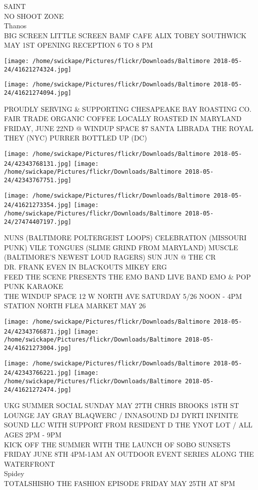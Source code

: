 \documentclass[10pt,letterpaper]{article}
\begin{document}
SAINT\\
NO SHOOT ZONE\\
Thanos\\
BIG SCREEN LITTLE SCREEN BAMF CAFE ALIX TOBEY SOUTHWICK MAY 1ST OPENING RECEPTION 6 TO 8 PM
\pagebreak

\texttt{[image: /home/swickape/Pictures/flickr/Downloads/Baltimore 2018-05-24/41621274324.jpg]}

\vspace{0.25in}
\texttt{[image: /home/swickape/Pictures/flickr/Downloads/Baltimore 2018-05-24/41621274094.jpg]}

PROUDLY SERVING \& SUPPORTING CHESAPEAKE BAY ROASTING CO. FAIR TRADE ORGANIC COFFEE LOCALLY ROASTED IN MARYLAND\\
FRIDAY, JUNE 22ND @ WINDUP SPACE \$7 SANTA LIBRADA THE ROYAL THEY (NYC) PURRER BOTTLED UP (DC)
\pagebreak

\texttt{[image: /home/swickape/Pictures/flickr/Downloads/Baltimore 2018-05-24/42343768131.jpg]}
\texttt{[image: /home/swickape/Pictures/flickr/Downloads/Baltimore 2018-05-24/42343767751.jpg]}

\texttt{[image: /home/swickape/Pictures/flickr/Downloads/Baltimore 2018-05-24/41621273354.jpg]}
\texttt{[image: /home/swickape/Pictures/flickr/Downloads/Baltimore 2018-05-24/27474407197.jpg]}

NUNS (BALTIMORE POLTERGEIST LOOPS) CELEBRATION (MISSOURI PUNK) VILE TONGUES (SLIME GRIND FROM MARYLAND) MUSCLE (BALTIMORE'S NEWEST LOUD RAGERS) SUN JUN @ THE CR\\
DR. FRANK EVEN IN BLACKOUTS MIKEY ERG\\
FEED THE SCENE PRESENTS THE EMO BAND LIVE BAND EMO \& POP PUNK KARAOKE\\
THE WINDUP SPACE 12 W NORTH AVE SATURDAY 5/26 NOON {-} 4PM STATION NORTH FLEA MARKET MAY 26
\pagebreak

\texttt{[image: /home/swickape/Pictures/flickr/Downloads/Baltimore 2018-05-24/42343766871.jpg]}
\texttt{[image: /home/swickape/Pictures/flickr/Downloads/Baltimore 2018-05-24/41621273004.jpg]}

\texttt{[image: /home/swickape/Pictures/flickr/Downloads/Baltimore 2018-05-24/42343766221.jpg]}
\texttt{[image: /home/swickape/Pictures/flickr/Downloads/Baltimore 2018-05-24/41621272474.jpg]}

UKG SUMMER SOCIAL SUNDAY MAY 27TH CHRIS BROOKS 18TH ST LOUNGE JAY GRAY BLAQWERC / INNASOUND DJ DYRTI INFINITE SOUND LLC WITH SUPPORT FROM RESIDENT D THE YNOT LOT / ALL AGES 2PM {-} 9PM\\
KICK OFF THE SUMMER WITH THE LAUNCH OF SOBO SUNSETS FRIDAY JUNE 8TH 4PM{-}1AM AN OUTDOOR EVENT SERIES ALONG THE WATERFRONT\\
Spidey\\
TOTALSHISHO THE FASHION EPISODE FRIDAY MAY 25TH AT 8PM
\pagebreak
\end{document}
